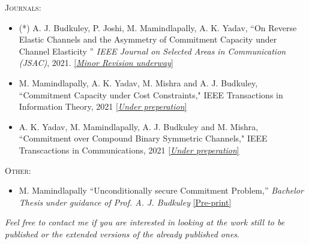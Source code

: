 \documentclass[a4paper,10pt]{article}
\def \siteurl{https://manideepmamindlapally.ninja}
\begin{document}
\begin{flushleft}
\textsc{Journals}:	
\begin{itemize}
	\item (*) A. J. Budkuley, P. Joshi, M. Mamindlapally, A. K. Yadav, ``On Reverse Elastic Channels and the Asymmetry of Commitment Capacity under Channel Elasticity
	'' \textit{IEEE Journal on Selected Areas in Communication (JSAC)}, 2021. \href{https://www.comsoc.org/publications/journals/ieee-jsac}{\small{[\textit{Minor Revision underway}]}}
	\item M. Mamindlapally, A. K. Yadav, M. Mishra and A. J. Budkuley, ``Commitment Capacity under Cost Constraints," IEEE Transactions in Information Theory, 2021 \href{https://ieeexplore.ieee.org/}{\small{[\textit{Under preperation}]}}
	\item A. K. Yadav, M. Mamindlapally, A. J. Budkuley and M. Mishra, ``Commitment over Compound Binary Symmetric Channels," IEEE Transcactions in Communications, 2021
	\href{https://ieeexplore.ieee.org/}{\small{[\textit{Under preperation}]}}
\end{itemize}
\end{flushleft}

\begin{flushleft}
	\textsc{Other}:	
	\begin{itemize}
		\item M. Mamindlapally ``Unconditionally secure Commitment Problem,'' \textit{Bachelor Thesis}\textit{ under guidance of Prof. A. J. Budkuley} \href{\siteurl /assests/files/prints/Bachelor_Thesis_Manideep_17EC34003/main.pdf}{[Pre-print]}
	\end{itemize}
\end{flushleft}
\footnotesize{\textit{Feel free to contact me if you are interested in looking at the work still to be published or the extended versions of the already published ones}}\normalsize{.}
\end{document}
